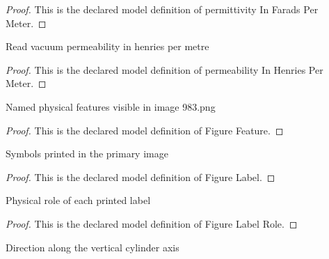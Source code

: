 \begin{proof}
  This is the declared model definition of permittivity In Farads Per Meter.
\end{proof}
\begin{definition}
  \label{def:physics:phyx-mini-0983:phyxminiproblems-problemphyxmini0983-permeabilityinhenriespermeter}
  Read vacuum permeability in henries per metre
\end{definition}
\begin{proof}
  This is the declared model definition of permeability In Henries Per Meter.
\end{proof}
\begin{definition}
  \label{def:physics:phyx-mini-0983:phyxminiproblems-problemphyxmini0983-figurefeature}
  Named physical features visible in image 983.png
\end{definition}
\begin{proof}
  This is the declared model definition of Figure Feature.
\end{proof}
\begin{definition}
  \label{def:physics:phyx-mini-0983:phyxminiproblems-problemphyxmini0983-figurelabel}
  Symbols printed in the primary image
\end{definition}
\begin{proof}
  This is the declared model definition of Figure Label.
\end{proof}
\begin{definition}
  \label{def:physics:phyx-mini-0983:phyxminiproblems-problemphyxmini0983-figurelabelrole}
  Physical role of each printed label
\end{definition}
\begin{proof}
  This is the declared model definition of Figure Label Role.
\end{proof}
\begin{definition}
  \label{def:physics:phyx-mini-0983:phyxminiproblems-problemphyxmini0983-axialdirection}
  Direction along the vertical cylinder axis
\end{definition}
